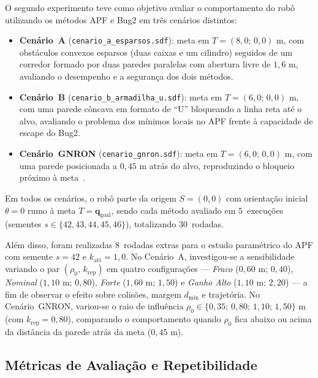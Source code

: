 O segundo experimento teve como objetivo avaliar o comportamento do robô utilizando os métodos APF e Bug2 em três cenários distintos:
\begin{itemize}
    \item \textbf{Cenário~A} (\texttt{cenario\_\allowbreak a\_\allowbreak esparsos.sdf}): meta em $T = (8{,}0;\, 0{,}0)\text{ m}$, com obstáculos convexos esparsos (duas caixas e um cilindro) seguidos de um corredor formado por duas paredes paralelas com abertura livre de $1{,}6\text{ m}$, avaliando o desempenho e a segurança dos dois métodos.
    \item \textbf{Cenário~B} (\texttt{cenario\_\allowbreak b\_\allowbreak armadilha\_\allowbreak u.sdf}): meta em $T = (6{,}0;\, 0{,}0)\text{ m}$, com uma parede côncava em formato de ``U'' bloqueando a linha reta até o alvo, avaliando o problema dos mínimos locais no APF frente à capacidade de escape do Bug2.
    \item \textbf{Cenário~GNRON} (\texttt{cenario\_\allowbreak gnron.sdf}): meta em $T = (6{,}0;\, 0{,}0)\text{ m}$, com uma parede posicionada a $0{,}45\text{ m}$ atrás do alvo, reproduzindo o bloqueio próximo à meta~\cite{ge2000}.
\end{itemize}

Em todos os cenários, o robô parte da origem $S = (0, 0)$ com orientação inicial $\theta = 0$ rumo à meta $T = \mathbf{q}_{\text{goal}}$, sendo cada método avaliado em $5$~execuções (sementes $s \in \{42, 43, 44, 45, 46\}$), totalizando $30$~rodadas.

Além disso, foram realizadas $8$~rodadas extras para o estudo paramétrico do APF com semente $s = 42$ e $k_{\text{att}} = 1{,}0$. No Cenário~A, investigou-se a sensibilidade variando o par $(\rho_0,\, k_{\text{rep}})$ em quatro configurações --- \textit{Fraco} ($0{,}60\text{ m};\, 0{,}40$), \textit{Nominal} ($1{,}10\text{ m};\, 0{,}80$), \textit{Forte} ($1{,}60\text{ m};\, 1{,}50$) e \textit{Ganho Alto} ($1{,}10\text{ m};\, 2{,}20$) --- a fim de observar o efeito sobre colisões, margem $d_{\min}$ e trajetória. No Cenário~GNRON, variou-se o raio de influência $\rho_0 \in \{0{,}35;\, 0{,}80;\, 1{,}10;\, 1{,}50\}\text{ m}$ (com $k_{\text{rep}} = 0{,}80$), comparando o comportamento quando $\rho_0$ fica abaixo ou acima da distância da parede atrás da meta ($0{,}45\text{ m}$).



\subsection{Métricas de Avaliação e Repetibilidade}

